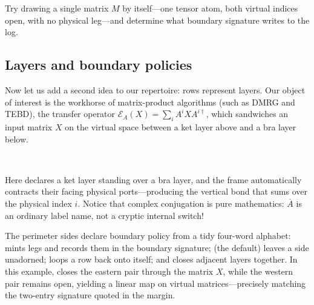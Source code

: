  Try drawing a single matrix $M$ by itself---one
tensor atom, both virtual indices open, with no physical leg---and determine
what boundary signature \pkg{} writes to the log.

\subsection{Layers and boundary policies}

Now let us add a second idea to our repertoire: rows represent layers.  Our
object of interest is the workhorse of matrix-product algorithms (such as DMRG
and TEBD), the transfer operator $\mathcal E_A(X)=\sum_i A^iXA^{i\dagger}$,
which sandwiches an input matrix $X$ on the virtual space between a ket layer
above and a bra layer below.

\begin{tnexample}[
  formula={\mathcal E_A(X)=\sum_i A^i X A^{i\dagger}},
  caption={the channel applied to $X$},
  index={$X$ closes the east input pair.  The west pair remains open because
    the output is a matrix; the vertical connection sums the physical
    index $i$.},
  signature={kernel-boundary|signature=open:w, open:w}]
\begin{tenkz}[rows={ket,bra}, cols=1, west=open, east={cup=$X$}]
   \\
\end{tenkz}
\end{tnexample}

Here  declares a ket layer standing over a bra layer, and the
frame automatically contracts their facing physical ports---producing the
vertical bond that sums over the physical index $i$.  Notice that complex
conjugation is pure mathematics: $\overline{A}$ is an ordinary label name, not
a cryptic internal switch!

The perimeter sides declare boundary policy from a tidy four-word alphabet:
 mints legs and records them in the boundary signature;
 (the default) leaves a side unadorned;  loops a row
back onto itself; and  closes adjacent layers together.  In this
example,  closes the eastern pair through the
matrix $X$, while the western pair remains open, yielding a linear map on
virtual matrices---precisely matching the two-entry signature quoted in the
margin.

